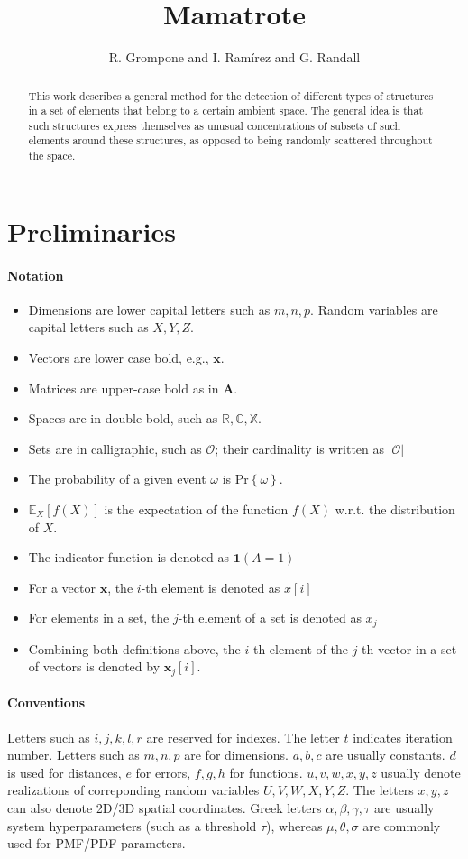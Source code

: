 \documentclass[a4page,11pt]{article}
\author{R. Grompone and I. Ramírez and G. Randall}
\title{Mamatrote}
\renewcommand{\vec}[1]{\mathbf{#1}}%
\newcommand{\mat}[1]{\mathbf{#1}}%
\newcommand{\set}[1]{\mathcal{#1}}%
\newcommand{\expe}[2]{\mathbb{E}_{#1}\left[#2\right]}%
\newcommand{\prob}[1]{\mathrm{Pr}\left\{#1\right\}}%
\newcommand{\ind}[1]{\mathbf{1}\left(#1\right)}%
\begin{document}
\begin{abstract}
This work describes a general method for the detection of different types of structures in a set of elements that belong to a certain ambient space. The general idea is that such structures express themselves as unusual concentrations of subsets of such elements around these structures, as opposed to being randomly scattered throughout the space. 
\end{abstract}

\section{Preliminaries}


\paragraph{Notation}

\begin{itemize}
\item Dimensions are lower capital letters such as $m,n,p$. Random variables are capital letters such as $X,Y,Z$. 
\item Vectors are lower case bold, e.g., $\vec{x}$. 
\item Matrices are upper-case bold as in $\mat{A}$. 
\item Spaces are in double bold, such as $\mathbb{R},\mathbb{C},\mathbb{X}$.
\item Sets are in calligraphic, such as $\set{O}$; their cardinality is written as $|\set{O}|$
\item The probability of a given event $\omega$ is $\prob{\omega}$. 
\item $\expe{X}{f(X)}$ is the expectation of the function $f(X)$ w.r.t. the distribution of $X$.
\item The indicator function is denoted as $\ind{A=1}$
\item For a vector $\vec{x}$, the $i$-th element is denoted as $x[i]$
\item For elements in a set, the $j$-th element of a set is denoted as $x_j$
\item Combining both definitions above, the $i$-th element of the $j$-th vector in a set of vectors is denoted by $\vec{x}_j[i]$.
\end{itemize}

\paragraph{Conventions}
Letters such as $i,j,k,l,r$ are reserved for indexes. The letter $t$ indicates  iteration number. Letters such as $m,n,p$ are for dimensions. $a,b,c$ are usually constants. $d$ is used for distances,  $e$ for errors, $f,g,h$ for functions. $u,v,w,x,y,z$ usually denote realizations of correponding random variables $U,V,W,X,Y,Z$. The letters $x,y,z$ can also denote 2D/3D spatial coordinates.
Greek letters $\alpha,\beta,\gamma,\tau$ are usually system hyperparameters (such as a threshold $\tau$), whereas $\mu,\theta,\sigma$ are commonly used for PMF/PDF parameters.
\end{document}
